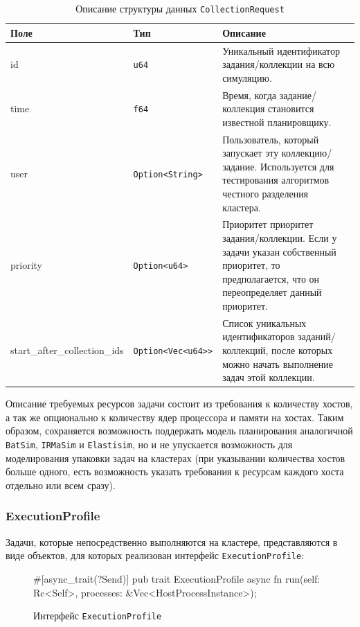 \begin{table}[h!]
    \centering
    \begin{tabular}{|l|l|p{8cm}|}
        \hline
        \textbf{Поле} & \textbf{Тип} & \textbf{Описание} \\ 
        \hline
        id & \texttt{u64} & Уникальный идентификатор задания/коллекции на всю симуляцию. \\
        \hline
        time & \texttt{f64} & Время, когда задание/коллекция становится известной планировщику. \\
        \hline
        user & \texttt{Option<String>} & Пользователь, который запускает эту коллекцию/задание. Используется для тестирования алгоритмов честного разделения кластера. \\
        \hline
        priority & \texttt{Option<u64>} & Приоритет приоритет задания/коллекции. Если у задачи указан собственный приоритет, то предполагается, что он переопределяет данный приоритет. \\
        \hline
        start\_after\_collection\_ids & \texttt{Option<Vec<u64>>} & Список уникальных идентификаторов заданий/коллекций, после которых можно начать выполнение задач этой коллекции. \\
        \hline
    \end{tabular}
    \caption{Описание структуры данных \texttt{CollectionRequest}}
    \label{tab:collection}
\end{table}

Описание требуемых ресурсов задачи состоит из требования к количеству хостов, а так же опционально к количеству ядер процессора и памяти на хостах. Таким образом, сохраняется возможность поддержать модель планирования аналогичной \texttt{BatSim}, \texttt{IRMaSim} и \texttt{Elastisim}, но и не упускается возможность для моделирования упаковки задач на кластерах (при указывании количества хостов больше одного,  есть возможность указать требования к ресурсам каждого хоста отдельно или всем сразу).

\subsubsection{ExecutionProfile}\label{sec:execution-profile}

Задачи, которые непосредственно выполняются на кластере, представляются в виде объектов, для которых реализован интерфейс \texttt{ExecutionProfile}:

\begin{figure}[h!]
    \small
\begin{rustcode}
#[async_trait(?Send)]
pub trait ExecutionProfile {
  async fn run(self: Rc<Self>, processes: &Vec<HostProcessInstance>);
}
\end{rustcode}
\caption{Интерфейс \texttt{ExecutionProfile}}
\end{figure}

